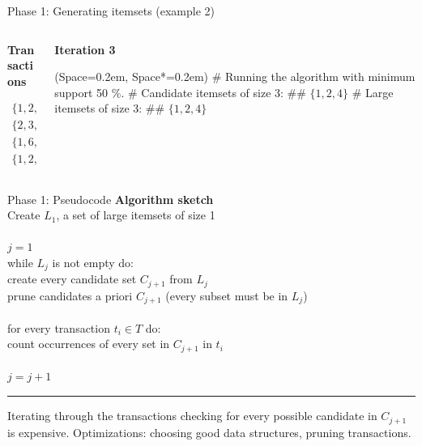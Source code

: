 \documentclass[12pt, aspectratio=1610]{beamer}
\newcommand{\listSpace}{0.2em}
\theoremstyle{plain}
\begin{document}
\begin{frame}[fragile]{Phase 1: Generating itemsets (example 2)}
	\begin{Example}
		\begin{columns}
			\begin{column}{0.25\textwidth}
				
				\begin{center}
					\textbf{Transactions}
				\end{center}
				\vspace{-1em}
				\begin{align*}
				\{ 1, 2, 7, 4 \} \\ 
				\{ 2, 3, 4 \} \\
				\{ 1, 6, 3 \} \\
				\{ 1, 2, 4, 5 \}
				\end{align*}
			\end{column}
			\begin{column}{0.75\textwidth}  %
				\begin{center}
					\textbf{Iteration 3}
				\end{center}
				\begin{easylist}[itemize]
					\ListProperties(Space=\listSpace, Space*=\listSpace)
					# Running the algorithm with minimum support 50 \%.
					# Candidate itemsets of size 3:
					## $\{1, 2, 4\}$
					# Large itemsets of size 3:
					## $\{1, 2, 4\}$
				\end{easylist}
			\end{column}
		\end{columns}
	\end{Example}
\end{frame}

\begin{frame}[fragile]{Phase 1: Pseudocode}
	\textbf{Algorithm sketch} \\
	Create $L_1$, a set of large itemsets of size 1 \\
	$ $ \\
	$j = 1$ \\
	while $L_j$ is not empty do: \\
	\hspace*{1em} create every candidate set $C_{j+ 1}$ from $L_j$ \\
	\hspace*{1em} prune candidates a priori $C_{j+ 1}$ (every subset must be in $L_j$) \\
	$ $ \\
	\hspace*{1em} for every transaction $t_i \in T$ do: \\
	\hspace*{2em} count occurrences of every set in $C_{j+ 1}$ in $t_i$  \\
	$ $ \\
	\hspace*{1em} $j = j +  1$
	$ $ \\
	\vspace*{0.5em}
	\hrule
	\vspace*{0.5em}
	Iterating through the transactions checking for every possible candidate in $C_{j+1}$ is expensive.
	Optimizations: choosing good data structures, pruning transactions.
\end{frame}
\end{document}

